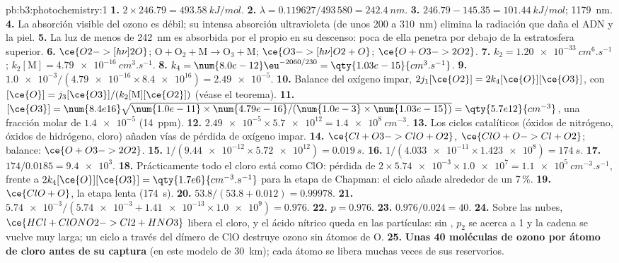 \begin{solution}{pb:b3:photochemistry:1}
\textbf{1.} $2 \times 246.79 = \qty{493.58}{kJ/mol}$.
\textbf{2.} $\lambda = 0.119627/493\,580 = \qty{242.4}{nm}$.
\textbf{3.} $246.79 - 145.35 = \qty{101.44}{kJ/mol}$; \qty{1179}{nm}.
\textbf{4.} La absorción visible del ozono es débil; su intensa absorción ultravioleta
(de unos 200 a \qty{310}{nm}) elimina la radiación que daña el ADN y la piel.
\textbf{5.} La luz de menos de \qty{242}{nm} es absorbida por el propio  en su descenso: poca de ella
penetra por debajo de la estratosfera superior.
\textbf{6.} $\ce{O2 ->[h\nu] 2 O}$; $\mathrm{O + O_2 + M \to O_3 + M}$; $\ce{O3 ->[h\nu] O2 + O}$; $\ce{O + O3 -> 2 O2}$.
\textbf{7.} $k_2 = \qty{1.20e-33}{cm^6.s^{-1}}$; $k_2[\mathrm M] = \qty{4.79e-16}{cm^3.s^{-1}}$.
\textbf{8.} $k_4 = \num{8.0e-12}\eu^{-2060/230} = \qty{1.03e-15}{cm^3.s^{-1}}$.
\textbf{9.} $\num{1.0e-3}/(\num{4.79e-16} \times \num{8.4e16}) = \num{2.49e-5}$.
\textbf{10.} Balance del oxígeno impar, $2j_1[\ce{O2}] = 2k_4[\ce{O}][\ce{O3}]$, con $[\ce{O}] = j_3[\ce{O3}]/(k_2[\mathrm M][\ce{O2}])$ (véase el
teorema).
\textbf{11.} $[\ce{O3}] = \num{8.4e16}\sqrt{\num{1.0e-11} \times \num{4.79e-16}/(\num{1.0e-3} \times \num{1.03e-15})} =
\qty{5.7e12}{cm^{-3}}$, una fracción molar de $\num{1.4e-5}$ (\qty{14}{ppm}).
\textbf{12.} $\num{2.49e-5} \times \num{5.7e12} = \qty{1.4e8}{cm^{-3}}$.
\textbf{13.} Los ciclos catalíticos (óxidos de nitrógeno, óxidos de hidrógeno, cloro) añaden vías
de pérdida de oxígeno impar.
\textbf{14.} $\ce{Cl + O3 -> ClO + O2}$, $\ce{ClO + O -> Cl + O2}$; balance: $\ce{O + O3 -> 2 O2}$.
\textbf{15.} $1/(\num{9.44e-12} \times \num{5.72e12}) = \qty{0.019}{s}$.
\textbf{16.} $1/(\num{4.033e-11} \times \num{1.423e8}) = \qty{174}{s}$.
\textbf{17.} $174/0.0185 = \num{9.4e3}$.
\textbf{18.} Prácticamente todo el cloro está como ClO: pérdida de $2 \times \num{5.74e-3} \times \num{1.0e7} = \qty{1.1e5}{cm^{-3}.s^{-1}}$,
frente a $2k_4[\ce{O}][\ce{O3}] = \qty{1.7e6}{cm^{-3}.s^{-1}}$ para la etapa de Chapman: el ciclo añade
alrededor de un 7\,\%.
\textbf{19.} $\ce{ClO + O}$, la etapa lenta (\qty{174}{s}).
\textbf{20.} $53.8/(53.8 + 0.012) = 0.99978$.
\textbf{21.} $\num{5.74e-3}/(\num{5.74e-3} + \num{1.41e-13} \times \num{1.0e9}) = 0.976$.
\textbf{22.} $p = 0.976$.
\textbf{23.} $0.976/0.024 = 40$.
\textbf{24.} Sobre las nubes, $\ce{HCl + ClONO2 -> Cl2 + HNO3}$ libera el cloro, y el ácido nítrico
queda en las partículas: sin , $p_2$ se acerca a 1 y la cadena se vuelve
muy larga; un ciclo a través del dímero de ClO destruye ozono sin átomos de O.
\textbf{25.} \textbf{Unas 40 moléculas de ozono por átomo de cloro antes de su captura} (en este
modelo de \qty{30}{km}); cada átomo se libera muchas veces de sus reservorios.
\end{solution}
